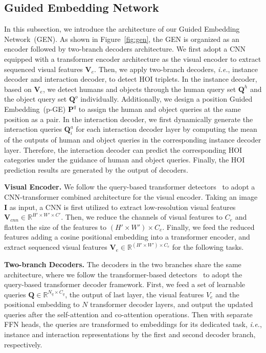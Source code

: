 \documentclass[10pt,twocolumn,letterpaper]{article}
\begin{document}
\vspace{-1mm}\subsection{Guided Embedding Network}\label{sec:pen}\vspace{-1mm}
In this subsection, we introduce the architecture of our Guided Embedding Network~(GEN). As shown in Figure~\ref{fig:gen}, the GEN is organized as an encoder followed by two-branch decoders architecture. We first adopt a CNN equipped with a transformer encoder architecture as the visual encoder to extract sequenced visual features $\bm{V}_e$. Then, we apply two-branch decoders, \emph{i.e.}, instance decoder and interaction decoder, to detect HOI triplets. In the instance decoder, based on $\bm{V}_e$, we detect humans and objects through the human query set $\bm{Q}^h$ and the object query set $\bm{Q}^o$ individually. Additionally, we design a position Guided Embedding~(p-GE) $\bm{P}^q$ to assign the human and object queries at the same position as a pair. In the interaction decoder, we first dynamically generate the interaction queries $\bm{Q}^a_i$ for each interaction decoder layer by computing the mean of the outputs of human and object queries in the corresponding instance decoder layer. Therefore, the interaction decoder can predict the corresponding HOI categories under the guidance of human and object queries. Finally, the HOI prediction results are generated by the output of decoders.

\vspace{1mm}\noindent\textbf{Visual Encoder.} We follow the query-based transformer detectors~\cite{carion2020endtoend,tamura2021qpic,zou2021_hoitrans} to adopt a CNN-transformer combined architecture for the visual encoder. Taking an image $\bm{I}$ as input, a CNN is first utilized to extract low-resolution visual features $\bm{V}_{cnn} \in \mathbb{R}^{H'\times W' \times C'}$. Then, we reduce the channels of visual features to $C_e$ and flatten the size of the features to ${(H'\times W') \times C_e}$. Finally, we feed the reduced features adding a cosine positional embedding into a transformer encoder, and extract sequenced visual features $\bm{V}_e \in \mathbb{R}^{(H'\times W') \times C_e}$ for the following tasks.

\vspace{1mm}\noindent\textbf{Two-branch Decoders.} The decoders in the two branches share the same architecture, where we follow the transformer-based detectors~\cite{carion2020endtoend,chen_2021_asnet} to adopt the query-based transformer decoder framework. First, we feed a set of learnable queries $\bm{Q}\in \mathbb{R}^{N_q\times C_q}$, the output of last layer, the visual features $V_e$ and the positional embedding to $N$ transformer decoder layers, and output the updated queries after the self-attention and co-attention operations. Then with separate FFN heads, the queries are transformed to embeddings for its dedicated task, \emph{i.e.}, instance and interaction representations by the first and second decoder branch, respectively.
\end{document}
